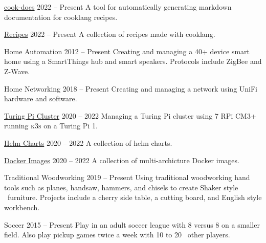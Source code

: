 
\WorkEntry
  {\href{https://github.com/nicholaswilde/cook-docs}{cook-docs}}
  {2022 -- Present}
  {}
  {A tool for automatically generating markdown documentation for cooklang recipes.}
\sepspace

\WorkEntry
  {\href{https://github.com/nicholaswilde/recipes}{Recipes}}
  {2022 -- Present}
  {}
  {A collection of recipes made with cooklang.}
\sepspace

\WorkEntry
  {Home Automation}
  {2012 -- Present}
  {}
  {Creating and managing a 40+ device smart home using a SmartThings hub and smart speakers. Protocols include ZigBee and Z-Wave.}
\sepspace

\WorkEntry
  {Home Networking}
  {2018 -- Present}
  {}
  {Creating and managing a network using UniFi hardware and software.}
\sepspace

\WorkEntry
  {\href{https://github.com/nicholaswilde/home-cluster}{Turing Pi Cluster}}
  {2020 -- 2022}
  {}
  {Managing a Turing Pi cluster using 7 RPi CM3+ running \textsc{k3s} on a Turing Pi 1.}
\sepspace

\WorkEntry
  {\href{https://github.com/nicholaswilde/helm-charts}{Helm Charts}}
  {2020 -- 2022}
  {}
  {A collection of helm charts.}
\sepspace

\WorkEntry
  {\href{https://github.com/search?q=user\%3Anicholaswilde+docker&type=Repositories}{Docker Images}}
  {2020 -- 2022}
  {}
  {A collection of multi-archicture Docker images.}
\sepspace

\WorkEntry
  {Traditional Woodworking}
  {2019 -- Present}
  {}
  {Using traditional woodworking hand tools such as planes, handsaw, hammers, and chisels to create Shaker style%
  \ furniture. Projects include a cherry side table, a cutting board, and English style workbench.}
\sepspace

\WorkEntry
  {Soccer}
  {2015 -- Present}
  {}
  {Play in an adult soccer league with 8 versus 8 on a smaller field. Also play pickup games twice a week with 10 to 20%
  \ other players.}
